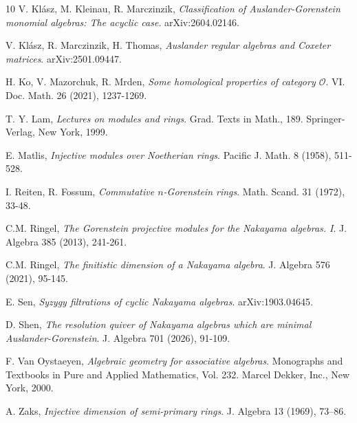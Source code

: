 \documentclass[a4paper,reqno]{amsart}
\numberwithin{equation}{section}
\theoremstyle{plain}
\theoremstyle{definition}
\theoremstyle{remark}
\renewcommand{\-}{\mbox{-}}
\newcommand{\scO}{\mathcal{O}}
\begin{document}
\begin{thebibliography}{10}
V. Kl\'asz, M. Kleinau, R. Marczinzik,
{\em Classification of Auslander-Gorenstein monomial algebras: The acyclic case}.
arXiv:2604.02146.


V. Kl\'asz, R. Marczinzik, H. Thomas,
{\em Auslander regular algebras and Coxeter matrices}.
arXiv:2501.09447.




H. Ko, V. Mazorchuk, R. Mrden, 
{\em Some homological properties of category \(\scO\)}.
VI. Doc. Math. 26 (2021), 1237-1269.

T. Y. Lam,
{\em Lectures on modules and rings}.
Grad. Texts in Math., 189. 
Springer-Verlag, New York, 1999.

E. Matlis, 
{\em Injective modules over Noetherian rings}. 
Pacific J. Math. 8 (1958), 511-528.


I. Reiten, R. Fossum, 
{\em Commutative \(n\)-Gorenstein rings}.
Math. Scand. 31 (1972), 33-48.


C.M. Ringel, 
{\em The Gorenstein projective modules for the Nakayama algebras. I}.
J. Algebra 385 (2013), 241-261.


C.M. Ringel, 
{\em The finitistic dimension of a Nakayama algebra}.
J. Algebra 576 (2021), 95-145.

E. Sen, 
{\em Syzygy filtrations of cyclic Nakayama algebras}.
arXiv:1903.04645.

D. Shen,
{\em The resolution quiver of Nakayama algebras which are minimal Auslander-Gorenstein}.
J. Algebra 701 (2026),  91-109.



F. Van Oystaeyen, 
{\em Algebraic geometry for associative algebras}. 
Monographs and Textbooks in Pure and Applied Mathematics, Vol. 232. 
Marcel Dekker, Inc., New York, 2000.


A. Zaks,
{\em Injective dimension of semi-primary rings}.
J. Algebra 13 (1969), 73--86.

\end{thebibliography}
\end{document}
